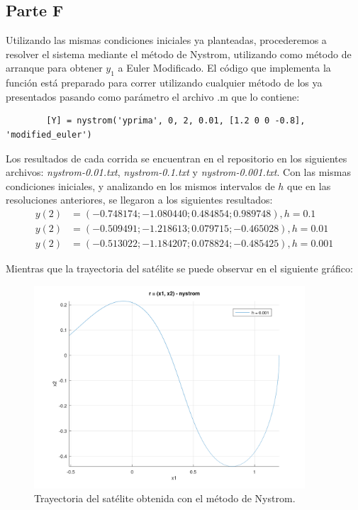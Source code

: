 \documentclass[titlepage,a4paper]{article}
\begin{document}
	\subsection{Parte F}\label{sec:parteF}
	Utilizando las mismas condiciones iniciales ya planteadas, procederemos a resolver el sistema mediante el método de Nystrom, utilizando como método de arranque para obtener $ y_1 $ a Euler Modificado. El código que implementa la función está preparado para correr utilizando cualquier método de los ya presentados pasando como parámetro el archivo .m que lo contiene:
	\begin{lstlisting}
		[Y] = nystrom('yprima', 0, 2, 0.01, [1.2 0 0 -0.8], 'modified_euler')
	\end{lstlisting}

	

	Los resultados de cada corrida se encuentran en el repositorio en los siguientes archivos: \emph{nystrom-0.01.txt}, \emph{nystrom-0.1.txt} y \emph{nystrom-0.001.txt}. Con las mismas condiciones iniciales, y analizando en los mismos intervalos de $ h $ que en las resoluciones anteriores, se llegaron a los siguientes resultados:
	\begin{align*}
		y(2) &= (-0.748174; -1.080440; 0.484854; 0.989748), h = 0.1\\
		y(2) &= (-0.509491; -1.218613; 0.079715; -0.465028), h = 0.01\\
		y(2) &= (-0.513022; -1.184207; 0.078824; -0.485425), h = 0.001
	\end{align*}

	Mientras que la trayectoria del satélite se puede observar en el siguiente gráfico:

	\begin{figure}[H]
		\centering
		\includegraphics[width=0.9\textwidth]{nystrom.png}
		\caption{\label{fig:parted}Trayectoria del satélite obtenida con el método de Nystrom.}
	\end{figure}
\end{document}
